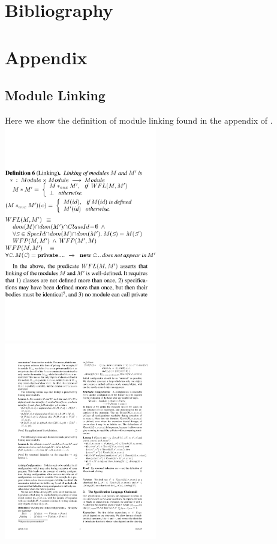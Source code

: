 \documentclass[a4paper,11pt,twoside]{article}
\begin{document}
{%
\small
\section{Bibliography}


\clearpage
\section{Appendix}
\subsection{Module Linking}\label{app:modulelinking}
Here we show the definition of module linking found in the appendix of \cite{drossopoulou2015b}.\\

\includegraphics[width=0.5\textwidth,valign=t]{figures/app_modlink1.pdf}\linebreak
\includegraphics[width=0.5\textwidth,valign=t]{figures/app_modlink2.pdf}
\clearpage
}
\end{document}
